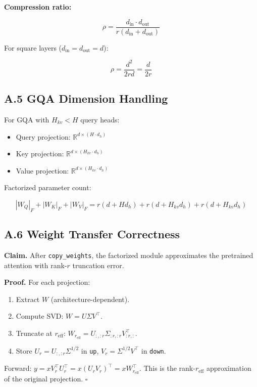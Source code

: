\textbf{Compression ratio:}

\[
\rho = \frac{d_\text{in} \cdot d_\text{out}}{r(d_\text{in} + d_\text{out})}
\tag{A.5}
\]

For square layers ($d_\text{in} = d_\text{out} = d$):

\[
\rho = \frac{d^2}{2rd} = \frac{d}{2r}
\tag{A.6}
\]

\subsection{A.5 GQA Dimension Handling}

For GQA with $H_{kv} < H$ query heads:

\begin{itemize}
\item Query projection: $\mathbb{R}^{d \times (H \cdot d_h)}$
\item Key projection: $\mathbb{R}^{d \times (H_{kv} \cdot d_h)}$
\item Value projection: $\mathbb{R}^{d \times (H_{kv} \cdot d_h)}$

\end{itemize}
Factorized parameter count:

\[
|W_Q|_F + |W_K|_F + |W_V|_F = r(d + H d_h) + r(d + H_{kv} d_h) + r(d + H_{kv} d_h)
\tag{A.7}
\]

\subsection{A.6 Weight Transfer Correctness}

\textbf{Claim.} After \texttt{copy\_weights}, the factorized module approximates the 
pretrained attention with rank-$r$ truncation error.

\textbf{Proof.} For each projection:
\begin{enumerate}
\item Extract $W$ (architecture-dependent).
\item Compute SVD: $W = U \Sigma V^\top$.
\item Truncate at $r_\text{eff}$: $W_{r_\text{eff}} = U_{:, :r} \Sigma_{:r, :r} V_{:r, :}^\top$.
\item Store $U_r = U_{:, :r} \Sigma^{1/2}$ in \texttt{up}, $V_r = \Sigma^{1/2} V^\top$ in \texttt{down}.

\end{enumerate}
Forward: $y = x V_r^\top U_r^\top = x (U_r V_r)^\top = x W_{r_\text{eff}}^\top$. 
This is the rank-$r_\text{eff}$ approximation of the original projection. $\square$

